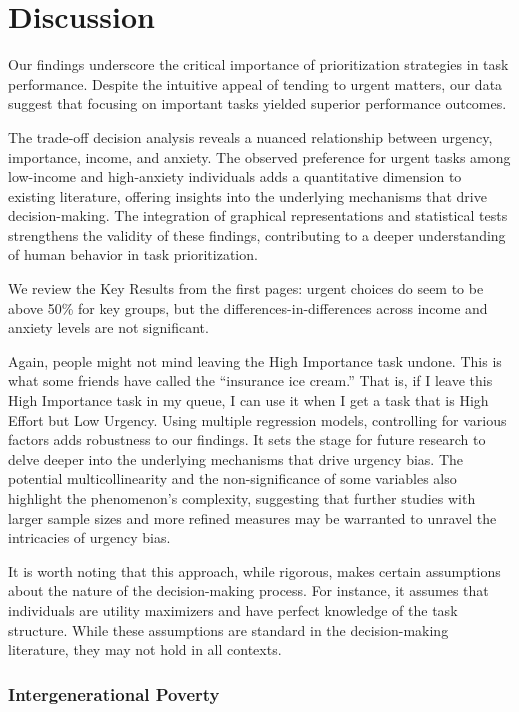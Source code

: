 \documentclass[
]{report}
\begin{document}
\hypertarget{discussion}{%
\chapter{Discussion}\label{discussion}}

Our findings underscore the critical importance of prioritization
strategies in task performance. Despite the intuitive appeal of tending
to urgent matters, our data suggest that focusing on important tasks
yielded superior performance outcomes.

The trade-off decision analysis reveals a nuanced relationship between
urgency, importance, income, and anxiety. The observed preference for
urgent tasks among low-income and high-anxiety individuals adds a
quantitative dimension to existing literature, offering insights into
the underlying mechanisms that drive decision-making. The integration of
graphical representations and statistical tests strengthens the validity
of these findings, contributing to a deeper understanding of human
behavior in task prioritization.

We review the Key Results from the first pages: urgent choices do seem
to be above 50\% for key groups, but the differences-in-differences
across income and anxiety levels are not significant.

Again, people might not mind leaving the High Importance task undone.
This is what some friends have called the ``insurance ice cream.'' That
is, if I leave this High Importance task in my queue, I can use it when
I get a task that is High Effort but Low Urgency. Using multiple
regression models, controlling for various factors adds robustness to
our findings. It sets the stage for future research to delve deeper into
the underlying mechanisms that drive urgency bias. The potential
multicollinearity and the non-significance of some variables also
highlight the phenomenon's complexity, suggesting that further studies
with larger sample sizes and more refined measures may be warranted to
unravel the intricacies of urgency bias.

It is worth noting that this approach, while rigorous, makes certain
assumptions about the nature of the decision-making process. For
instance, it assumes that individuals are utility maximizers and have
perfect knowledge of the task structure. While these assumptions are
standard in the decision-making literature, they may not hold in all
contexts.

\hypertarget{intergenerational-poverty}{%
\subsection{Intergenerational Poverty}\label{intergenerational-poverty}}
\end{document}
